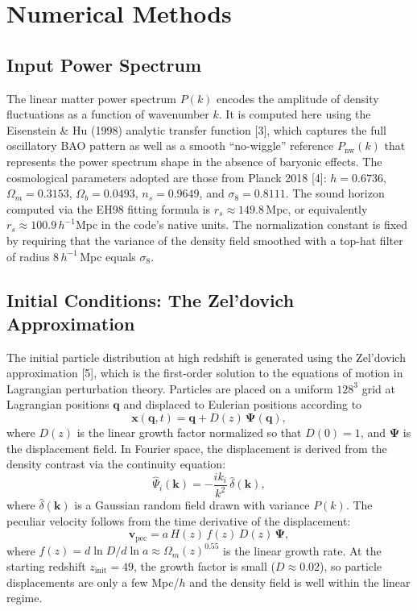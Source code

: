 \documentclass[10pt]{article}
\begin{document}
\section{Numerical Methods}

\subsection{Input Power Spectrum}

The linear matter power spectrum $P(k)$ encodes the amplitude of density fluctuations as a function of wavenumber $k$.  It is computed here using the Eisenstein \& Hu (1998) analytic transfer function [3], which captures the full oscillatory BAO pattern as well as a smooth ``no-wiggle'' reference $P_{\mathrm{nw}}(k)$ that represents the power spectrum shape in the absence of baryonic effects.  The cosmological parameters adopted are those from Planck 2018 [4]: $h = 0.6736$, $\Omega_m = 0.3153$, $\Omega_b = 0.0493$, $n_s = 0.9649$, and $\sigma_8 = 0.8111$.  The sound horizon computed via the EH98 fitting formula is $r_s \approx 149.8$\,Mpc, or equivalently $r_s \approx 100.9\,h^{-1}$Mpc in the code's native units.  The normalization constant is fixed by requiring that the variance of the density field smoothed with a top-hat filter of radius $8\,h^{-1}$\,Mpc equals $\sigma_8$.

\subsection{Initial Conditions: The Zel'dovich Approximation}

The initial particle distribution at high redshift is generated using the Zel'dovich approximation [5], which is the first-order solution to the equations of motion in Lagrangian perturbation theory.  Particles are placed on a uniform $128^3$ grid at Lagrangian positions $\mathbf{q}$ and displaced to Eulerian positions according to
\begin{equation}
  \mathbf{x}(\mathbf{q}, t) = \mathbf{q} + D(z)\,\boldsymbol{\Psi}(\mathbf{q}),
\end{equation}
where $D(z)$ is the linear growth factor normalized so that $D(0) = 1$, and $\boldsymbol{\Psi}$ is the displacement field.  In Fourier space, the displacement is derived from the density contrast via the continuity equation:
\begin{equation}
  \hat{\Psi}_i(\mathbf{k}) = -\frac{i k_i}{k^2}\,\hat{\delta}(\mathbf{k}),
\end{equation}
where $\hat{\delta}(\mathbf{k})$ is a Gaussian random field drawn with variance $P(k)$.  The peculiar velocity follows from the time derivative of the displacement:
\begin{equation}
  \mathbf{v}_{\mathrm{pec}} = a\,H(z)\,f(z)\,D(z)\,\boldsymbol{\Psi},
\end{equation}
where $f(z) = d\ln D/d\ln a \approx \Omega_m(z)^{0.55}$ is the linear growth rate.  At the starting redshift $z_{\mathrm{init}} = 49$, the growth factor is small ($D \approx 0.02$), so particle displacements are only a few Mpc/$h$ and the density field is well within the linear regime.
\end{document}
